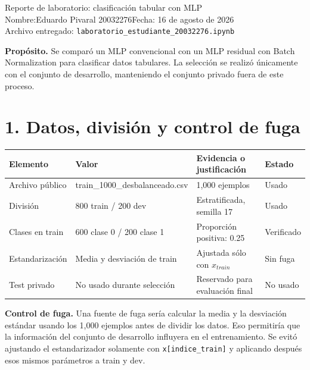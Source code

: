 \documentclass[10pt]{article}
\begin{document}
\begin{center}
{\LARGE Reporte de laboratorio: clasificación tabular con MLP}\\[0.4em]
Nombre:Eduardo Pivaral 20032276\hfill Fecha: 16 de agosto de 2026\\
Archivo entregado: \texttt{laboratorio\_estudiante\_20032276.ipynb}
\end{center}

\textbf{Propósito.} Se comparó un MLP convencional con un MLP residual con Batch Normalization para clasificar datos tabulares. La selección se realizó únicamente con el conjunto de desarrollo, manteniendo el conjunto privado fuera de este proceso.

\section*{1. Datos, división y control de fuga}
\begin{tabular}{@{}llll@{}}
\toprule
Elemento & Valor & Evidencia o justificación & Estado\\
\midrule
Archivo público & train\_1000\_desbalanceado.csv & 1,000 ejemplos & Usado\\
División & 800 train / 200 dev & Estratificada, semilla 17 & Usado\\
Clases en train & 600 clase 0 / 200 clase 1 & Proporción positiva: 0.25 & Verificado\\
Estandarización & Media y desviación de train & Ajustada sólo con $x_{train}$ & Sin fuga\\
Test privado & No usado durante selección & Reservado para evaluación final & No usado\\
\bottomrule
\end{tabular}

\vspace{0.6em}
\textbf{Control de fuga.} Una fuente de fuga sería calcular la media y la desviación estándar usando los 1,000 ejemplos antes de dividir los datos. Eso permitiría que la información del conjunto de desarrollo influyera en el entrenamiento. Se evitó ajustando el estandarizador solamente con \texttt{x[indice\_train]} y aplicando después esos mismos parámetros a train y dev.
\end{document}
